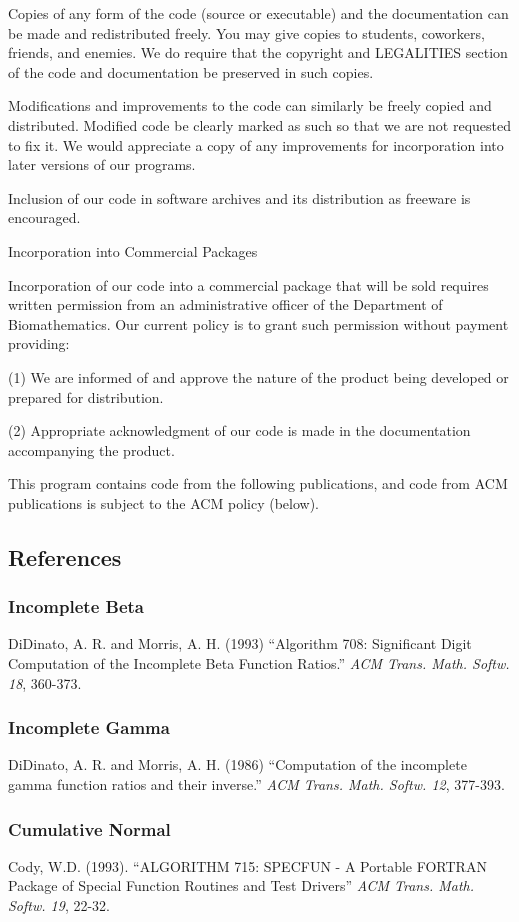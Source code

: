 \documentclass[12pt,dvips]{article}
\newcommand{\mysubsection}[1]
    {\color{green}\subsection{#1}\color{black}}
\newcommand{\mysubsubsection}[1]
    {\color{Orange}\subsubsection{#1}\color{black}}
\begin{document}
Copies of any   form of  the   code (source  or  executable)  and  the
documentation can  be made and   redistributed  freely.  You may  give
copies  to students, coworkers, friends,  and  enemies.  We do require
that   the  copyright   and  LEGALITIES  section   of   the code   and
documentation be preserved in  such copies.

Modifications   and improvements to the  code  can similarly be freely
copied and  distributed.  Modified code be clearly   marked as such so
that we are not  requested to fix it.   We would appreciate a copy  of
any improvements   for   incorporation into  later   versions  of  our
programs.

Inclusion of  our code in   software archives and its distribution  as
freeware is encouraged.

Incorporation into Commercial Packages

Incorporation of our code into a commercial package  that will be sold
requires   written permission  from  an administrative  officer of the
Department of Biomathematics.   Our  current policy is to  grant  such
permission without payment providing:

(1)  We are informed  of and approve  the nature of  the product being
developed or prepared for   distribution.  

(2) Appropriate  acknowledgment    of  our   code   is   made   in the
documentation accompanying the product.

This program  contains code from  the following publications, and code
from ACM publications is subject to the ACM policy (below).

\mysubsection{References}

\mysubsubsection{Incomplete Beta}

DiDinato, A. R. and Morris,  A.   H. (1993)  ``Algorithm 708: Significant
Digit Computation of the Incomplete  Beta  Function Ratios.''  {\em ACM
Trans. Math.  Softw. 18}, 360-373.

\mysubsubsection{Incomplete Gamma}

DiDinato, A. R. and Morris, A. H. (1986) ``Computation of the  incomplete
gamma function  ratios  and their  inverse.''   {\em ACM  Trans.  Math.
Softw. 12}, 377-393.

\mysubsubsection{Cumulative Normal}

Cody, W.D. (1993). ``ALGORITHM 715: SPECFUN - A Portable FORTRAN
Package of Special Function Routines and Test Drivers''
{\em ACM Trans. Math. Softw. 19}, 22-32.
\end{document}
